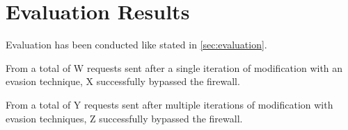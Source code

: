 \section{Evaluation Results}
\label{sec:EvaluationResults}
Evaluation has been conducted like stated in \ref{sec:evaluation}. 

From a total of {\color{red} W } requests sent after a single iteration of modification with an evasion technique, {\color{red} X } successfully bypassed the firewall. 

From a total of {\color{red} Y } requests sent after multiple iterations of modification with evasion techniques, {\color{red} Z } successfully bypassed the firewall. 
